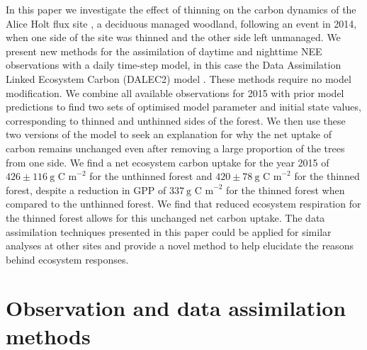 \documentclass[draft,linenumbers]{agujournal}
\begin{document}
In this paper we investigate the effect of thinning on the carbon dynamics of the Alice Holt flux site \citep{wilkinson2012inter}, a deciduous managed woodland, following an event in 2014, when one side of the site was thinned and the other side left unmanaged. 
We present new methods for the assimilation of daytime and nighttime NEE observations with a daily time-step model, in this case the Data Assimilation Linked Ecosystem Carbon (DALEC2) model \citep{Bloom2015}. These methods require no model modification. We combine all available observations for 2015 with prior model predictions to find two sets of optimised model parameter and initial state values, corresponding to thinned and unthinned sides of the forest. We then use these two versions of the model to seek an explanation for why the net uptake of carbon remains unchanged even after removing a large proportion of the trees from one side. We find a net ecosystem carbon uptake for the year 2015 of \(426 \pm 116~\text{g C m}^{-2}\) for the unthinned forest and \(420 \pm 78~\text{g C m}^{-2}\) for the thinned forest, despite a reduction in GPP of \(337~\text{g C m}^{-2}\) for the thinned forest when compared to the unthinned forest. We find that reduced ecosystem respiration for the thinned forest allows for this unchanged net carbon uptake. The data assimilation techniques presented in this paper could be applied for similar analyses at other sites and provide a novel method to help elucidate the reasons behind ecosystem responses.      

\section{Observation and data assimilation methods}
\end{document}
